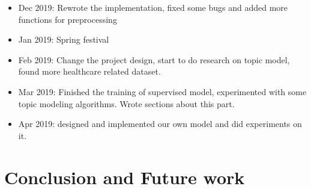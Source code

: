 \begin{itemize}
    \item Dec 2019: Rewrote the implementation, fixed some bugs and added more functions for preprocessing
    \item Jan 2019: Spring festival
    \item Feb 2019: Change the project design, start to do research on topic model, found more healthcare related dataset.
    \item Mar 2019: Finished the training of supervised model, experimented with some topic modeling algorithms. Wrote sections about this part.
    \item Apr 2019: designed and implemented our own model and did experiments on it.
\end{itemize} 

\section{Conclusion and Future work}
